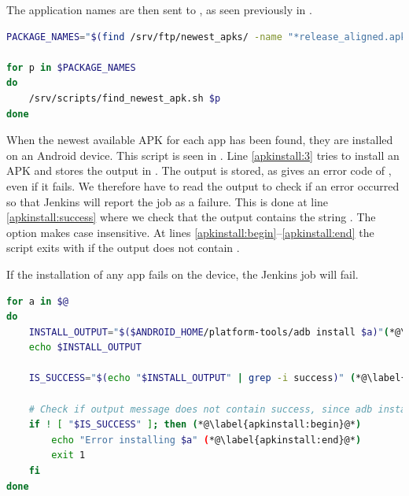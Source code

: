 The application names are then sent to , as seen previously in .

\begin{lstlisting}[language=bash,showstringspaces=false,caption=Bash script that finds the newest available APK for all apps,label=lst:find_all_newest_apks]
PACKAGE_NAMES="$(find /srv/ftp/newest_apks/ -name "*release_aligned.apk" | sed 's:.*/::' | sed 's:_v.*::' | sort | uniq)"

for p in $PACKAGE_NAMES
do
    /srv/scripts/find_newest_apk.sh $p
done
\end{lstlisting}

When the newest available APK for each app has been found, they are installed on an Android device. This script is seen in . Line \ref{apkinstall:3} tries to install an APK and stores the output in . The output is stored, as  gives an error code of , even if it fails. We therefore have to read the output to check if an error occurred so that Jenkins will report the job as a failure. This is done at line \ref{apkinstall:success} where we check that the output contains the string . The  option makes  case insensitive. At lines \ref{apkinstall:begin}--\ref{apkinstall:end} the script exits with  if the output does not contain .

If the installation of any app fails on the device, the Jenkins job will fail.

\begin{lstlisting}[language=bash,showstringspaces=false,caption=Script that installs the given APKs to an Android device,label=lst:install_apks_on_android_device]
for a in $@
do
    INSTALL_OUTPUT="$($ANDROID_HOME/platform-tools/adb install $a)"(*@\label{apkinstall:3}@*)
    echo $INSTALL_OUTPUT

    IS_SUCCESS="$(echo "$INSTALL_OUTPUT" | grep -i success)" (*@\label{apkinstall:success}@*)

    # Check if output message does not contain success, since adb install does not provide exit code != 0 at failure
    if ! [ "$IS_SUCCESS" ]; then (*@\label{apkinstall:begin}@*)
        echo "Error installing $a" (*@\label{apkinstall:end}@*)
        exit 1
    fi
done
\end{lstlisting}